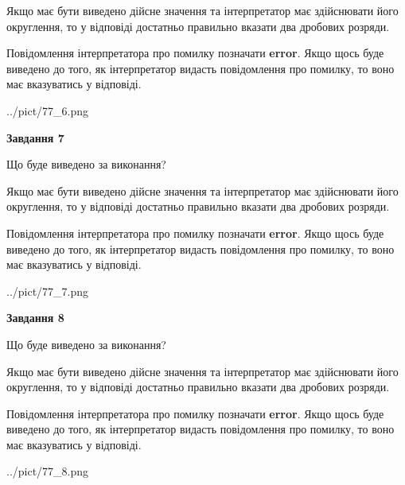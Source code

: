\documentclass[12pt, ukrainian]{article}
\begin{document}
{\begin {Large}
Якщо має бути виведено дійсне значення та інтерпретатор має здійснювати його округлення, 
то у відповіді достатньо правильно вказати два дробових розряди.

Повідомлення інтерпретатора про помилку позначати \textbf{error}.
Якщо щось буде виведено до того, як інтерпретатор видасть повідомлення про помилку, 
то воно має вказуватись у відповіді. \par

\begin{center}
	{../pict/77_6.png}
\end{center}
\newpage

{\begin {center}\textbf{Завдання 7}\end {center}}\par
Що буде виведено за виконання? \par

Якщо має бути виведено дійсне значення та інтерпретатор має здійснювати його округлення, 
то у відповіді достатньо правильно вказати два дробових розряди.

Повідомлення інтерпретатора про помилку позначати \textbf{error}.
Якщо щось буде виведено до того, як інтерпретатор видасть повідомлення про помилку, 
то воно має вказуватись у відповіді. \par

\begin{center}
	{../pict/77_7.png}
\end{center}
\newpage

{\begin {center}\textbf{Завдання 8}\end {center}}\par
Що буде виведено за виконання? \par

Якщо має бути виведено дійсне значення та інтерпретатор має здійснювати його округлення, 
то у відповіді достатньо правильно вказати два дробових розряди.

Повідомлення інтерпретатора про помилку позначати \textbf{error}.
Якщо щось буде виведено до того, як інтерпретатор видасть повідомлення про помилку, 
то воно має вказуватись у відповіді. \par

\begin{center}
	{../pict/77_8.png}
\end{center}
\newpage


\end{Large}}
\end{document}
